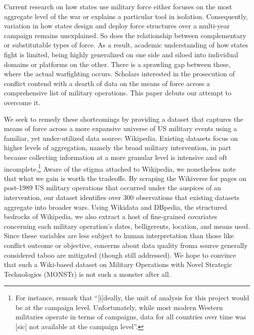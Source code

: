 \documentclass[fleqn,12pt]{article}
\begin{document}
Current research on how states use military force either focuses on the most aggregate level of the war or explains a particular tool in isolation. Consequently, variation in how states design and deploy force structures over a multi-year campaign remains unexplained. So does the relationship between complementary or substitutable types of force. As a result, academic understanding of how states fight is limited, being highly generalized on one side and siloed into individual domains or platforms on the other. There is a sprawling gap between these, where the actual warfighting occurs. Scholars interested in the prosecution of conflict contend with a dearth of data on the means of force across a comprehensive list of military operations. This paper debuts our attempt to overcome it.

We seek to remedy these shortcomings by providing a dataset that captures the means of force across a more expansive universe of US military events using a familiar, yet under-utilized data source: Wikipedia. Existing datasets focus on higher levels of aggregation, namely the broad military intervention, in part because collecting information at a more granular level is intensive and oft incomplete.\footnote{For instance, \citet[549]{allen_understandingimpactair_2017} remark that ``[i]deally, the unit of analysis for this project would be at the campaign level. Unfortunately, while most modern Western militaries operate in terms of campaigns, data for all countries over time was [sic] not available at the campaign level”.} Aware of the stigma attached to Wikipedia, we nonetheless note that what we gain is worth the tradeoffs. By scraping the Wikiverse for pages on post-1989 US military operations that occurred under the auspices of an intervention, our dataset identifies over 300 observations that existing datasets aggregate into broader wars. Using Wikidata and DBpedia, the structured bedrocks of Wikipedia, we also extract a host of fine-grained covariates concerning each military operation's dates, belligerents, location, and means used. Since these variables are less subject to human interpretation than those like conflict outcome or objective, concerns about data quality froma  source generally considered taboo are mitigated (though still addressed). We hope to convince that such a Wiki-based dataset on Military Operations with Novel Strategic Technologies (MONSTr) is not such a monster after all.
\end{document}
